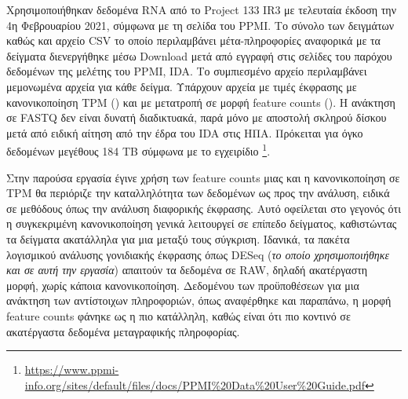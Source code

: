 \documentclass[12pt]{report}
\makeatletter
\let\oldchapter\chapter
\renewcommand{\chapter}{\@ifstar{\starchapter}{\nostarchapter}}
\newcommand{\starchapter}[1]{\oldchapter*{#1}\thispagestyle{mainstyle}}
\newcommand{\nostarchapter}[1]{\oldchapter{#1}\thispagestyle{mainstyle}}
\let\oldfootnote\footnote
\renewcommand{\footnote}[1]{\oldfootnote{\onehalfspacing #1}}
\makeatother
\begin{document}
    \chapter{Εισαγωγή}
    \par
        Χρησιμοποιήθηκαν δεδομένα RNA από το Project 133 IR3 με τελευταία έκδοση την 4η Φεβρουαρίου 2021, σύμφωνα με τη σελίδα του PPMI. Το σύνολο των δειγμάτων καθώς και αρχείο CSV το οποίο περιλαμβάνει μέτα-πληροφορίες αναφορικά με τα δείγματα διενεργήθηκε μέσω Download μετά από εγγραφή στις σελίδες του παρόχου δεδομένων της μελέτης του PPMI, IDA. Το συμπιεσμένο αρχείο περιλαμβάνει μεμονωμένα αρχεία για κάθε δείγμα. Υπάρχουν αρχεία με τιμές έκφρασης με κανονικοποίηση TPM (\emph{\cite{Zhao2021TPMRepository}}) και με μετατροπή σε μορφή feature counts (\emph{\cite{Liao2014FeatureCounts:Features}}). Η ανάκτηση σε FASTQ  δεν είναι δυνατή διαδικτυακά, παρά μόνο με αποστολή σκληρού δίσκου μετά από ειδική αίτηση από την έδρα του IDA στις ΗΠΑ. Πρόκειται για όγκο δεδομένων μεγέθους 184 TB σύμφωνα με το εγχειρίδιο \footnote{\url{https://www.ppmi-info.org/sites/default/files/docs/PPMI\%20Data\%20User\%20Guide.pdf}}.
    \par
        Στην παρούσα εργασία έγινε χρήση των feature counts μιας και η κανονικοποίηση σε TPM θα περιόριζε την καταλληλότητα των δεδομένων ως προς την ανάλυση, ειδικά σε μεθόδους όπως την ανάλυση διαφορικής έκφρασης. Αυτό οφείλεται στο γεγονός ότι η συγκεκριμένη κανονικοποίηση γενικά λειτουργεί σε επίπεδο δείγματος, καθιστώντας τα δείγματα ακατάλληλα για μια μεταξύ τους σύγκριση. Ιδανικά, τα πακέτα λογισμικού ανάλυσης γονιδιακής έκφρασης όπως DESeq (\emph{το οποίο χρησιμοποιήθηκε και σε αυτή την εργασία}) απαιτούν τα δεδομένα σε RAW, δηλαδή ακατέργαστη μορφή, χωρίς κάποια κανονικοποίηση. Δεδομένου των προϋποθέσεων για μια ανάκτηση των αντίστοιχων πληροφοριών, όπως αναφέρθηκε και παραπάνω, η μορφή feature counts φάνηκε ως η πιο κατάλληλη, καθώς είναι ότι πιο κοντινό σε ακατέργαστα δεδομένα μεταγραφικής πληροφορίας.
        
\end{document}
